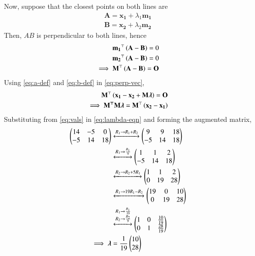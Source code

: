 \documentclass[journal,12pt,twocolumn]{IEEEtran}
\renewcommand{\vec}[1]{\boldsymbol{\mathbf{#1}}}
\begin{document}
\begin{enumerate}
    Now, suppose that the closest points on both lines are
    \begin{align}
        \vec{A} = \vec{x_1} + \lambda_1\vec{m_1} \label{eq:a-def} \\
        \vec{B} = \vec{x_2} + \lambda_2\vec{m_2}
        \label{eq:b-def}
    \end{align}
    Then, $AB$ is perpendicular to both lines, hence
    \begin{align}
        \vec{m_1}^\top\brak{\vec{A}-\vec{B}} = 0 \\
        \vec{m_2}^\top\brak{\vec{A}-\vec{B}} = 0 \\
        \implies \vec{M}^\top\brak{\vec{A}-\vec{B}} = \vec{O}
        \label{eq:perp-vec}
    \end{align}
    Using \eqref{eq:a-def} and \eqref{eq:b-def} in \eqref{eq:perp-vec},
    \begin{align}
        \vec{M}^\top\brak{\vec{x_1}-\vec{x_2} + \vec{M}\vec{\lambda}} = \vec{O} \\
        \implies \vec{M^\top M\lambda} = \vec{M}^\top\brak{\vec{x_2}-\vec{x_1}}
        \label{eq:lambda-eqn}
    \end{align}
    Substituting from \eqref{eq:vals} in \eqref{eq:lambda-eqn} and forming the 
    augmented matrix,
    \begin{align}
        \myvec{14&-5&0\\-5&14&18} &\xleftrightarrow[]{R_1\rightarrow R_1+R_2} \myvec{9&9&18\\-5&14&18} \\
                 &\xleftrightarrow[]{R_1\rightarrow\frac{R_1}{9}} \myvec{1&1&2\\-5&14&18} \\
                 &\xleftrightarrow[]{R_2\rightarrow R_2+5R_1} \myvec{1&1&2\\0&19&28} \\
                 &\xleftrightarrow[]{R_1\rightarrow19R_1-R_2} \myvec{19&0&10\\0&19&28} \\
                 &\xleftrightarrow[]{\substack{R_1\rightarrow\frac{R_1}{19}\\R_2\rightarrow\frac{R_2}{9}}}
                    \myvec{1&0&\frac{10}{19}\\0&1&\frac{28}{19}} \\
                    \implies \vec{\lambda} &= \frac{1}{19}\myvec{10\\28}
        \label{eq:lambda-sol}
    \end{align}

\end{enumerate}
\end{document}
